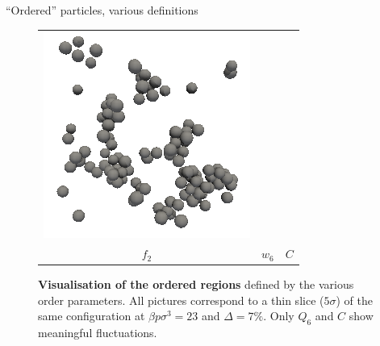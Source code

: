 \begin{frame}{``Ordered'' particles, various definitions}
\begin{figure}
\begin{tabular}{ccc}
	\includegraphics[width=0.3\columnwidth]{C_slice_3D}\\ 
	$f_2$ & $w_6$ & $C$ \\ 
	\end{tabular}
	\caption{\textbf{Visualisation of the ordered regions} defined by the various order parameters. All pictures correspond to a thin slice ($5\sigma$) of the same configuration at $\beta p\sigma^3=23$ and $\Delta=7\%$. Only $Q_6$ and $C$ show meaningful fluctuations.}
	\label{fig:3D}
\end{figure}
\end{frame}

